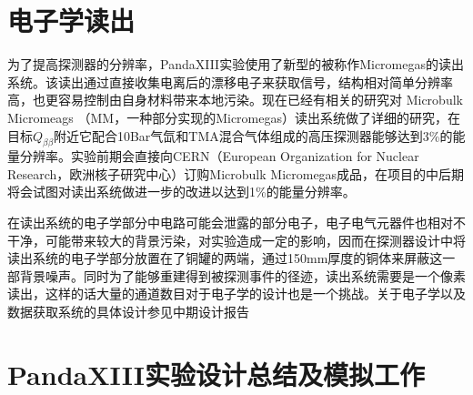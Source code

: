 \section{电子学读出}

为了提高探测器的分辨率，PandaXIII实验使用了新型的被称作Micromegas的读出系统。该读出通过直接收集电离后的漂移电子来获取信号，结构相对简单分辨率高，也更容易控制由自身材料带来本地污染。现在已经有相关的研究对 Microbulk Micromeags （MM，一种部分实现的Micromegas）读出系统做了详细的研究，在目标$Q_{\beta\beta}$附近它配合10Bar气氙和TMA混合气体组成的高压探测器能够达到3\%的能量分辨率。实验前期会直接向CERN（European Organization for Nuclear Research，欧洲核子研究中心）订购Microbulk Micromegas成品，在项目的中后期将会试图对读出系统做进一步的改进以达到1\%的能量分辨率。

在读出系统的电子学部分中电路可能会泄露的部分电子，电子电气元器件也相对不干净，可能带来较大的背景污染，对实验造成一定的影响，因而在探测器设计中将读出系统的电子学部分放置在了铜罐的两端，通过150mm厚度的铜体来屏蔽这一部背景噪声。同时为了能够重建得到被探测事件的径迹，读出系统需要是一个像素读出，这样的话大量的通道数目对于电子学的设计也是一个挑战。关于电子学以及数据获取系统的具体设计参见中期设计报告\supercite{cdr}

\section{PandaXIII实验设计总结及模拟工作}

